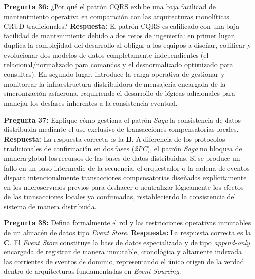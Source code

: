 \vspace{4mm}

\noindent\textbf{Pregunta 36:} ¿Por qué el patrón CQRS exhibe una baja facilidad de mantenimiento operativa en comparación con las arquitecturas monolíticas CRUD tradicionales?
\newline
\textbf{Respuesta:} El patrón CQRS es calificado con una baja facilidad de mantenimiento debido a dos retos de ingeniería: en primer lugar, duplica la complejidad del desarrollo al obligar a los equipos a diseñar, codificar y evolucionar dos modelos de datos completamente independientes (el relacional/normalizado para comandos y el desnormalizado optimizado para consultas). En segundo lugar, introduce la carga operativa de gestionar y monitorear la infraestructura distribuidora de mensajería encargada de la sincronización asíncrona, requiriendo el desarrollo de lógicas adicionales para manejar los desfases inherentes a la consistencia eventual.

\vspace{4mm}

\noindent\textbf{Pregunta 37:} Explique cómo gestiona el patrón \textit{Saga} la consistencia de datos distribuida mediante el uso exclusivo de transacciones compensatorias locales.
\newline
\textbf{Respuesta:} La respuesta correcta es la \textbf{B}. A diferencia de los protocolos tradicionales de confirmación en dos fases (\textit{2PC}), el patrón \textit{Saga} no bloquea de manera global los recursos de las bases de datos distribuidas. Si se produce un fallo en un paso intermedio de la secuencia, el orquestador o la cadena de eventos dispara intencionalmente transacciones compensatorias diseñadas explícitamente en los microservicios previos para deshacer o neutralizar lógicamente los efectos de las transacciones locales ya confirmadas, restableciendo la consistencia del sistema de manera distribuida.

\vspace{4mm}

\noindent\textbf{Pregunta 38:} Defina formalmente el rol y las restricciones operativas inmutables de un almacén de datos tipo \textit{Event Store}.
\newline
\textbf{Respuesta:} La respuesta correcta es la \textbf{C}. El \textit{Event Store} constituye la base de datos especializada y de tipo \textit{append-only} encargada de registrar de manera inmutable, cronológica y altamente indexada las corrientes de eventos de dominio, representando el único origen de la verdad dentro de arquitecturas fundamentadas en \textit{Event Sourcing}.

